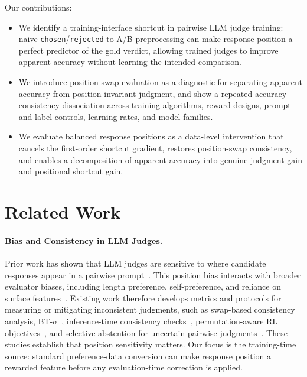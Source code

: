 \documentclass[letterpaper]{article}
\begin{document}
Our contributions:
\begin{itemize}
\item We identify a training-interface shortcut in pairwise LLM judge training: naive \texttt{chosen}/\texttt{rejected}-to-A/B preprocessing can make response position a perfect predictor of the gold verdict, allowing trained judges to improve apparent accuracy without learning the intended comparison.
\item We introduce position-swap evaluation as a diagnostic for separating apparent accuracy from position-invariant judgment, and show a repeated accuracy-consistency dissociation across training algorithms, reward designs, prompt and label controls, learning rates, and model families.
\item We evaluate balanced response positions as a data-level intervention that cancels the first-order shortcut gradient, restores position-swap consistency, and enables a decomposition of apparent accuracy into genuine judgment gain and positional shortcut gain.
\end{itemize}

\section{Related Work}

\paragraph{Bias and Consistency in LLM Judges.}
Prior work has shown that LLM judges are sensitive to where candidate responses appear in a pairwise prompt~\citep{zheng2023judging,wang2024largelanguagemodels,zhu2024judgebench}. This position bias interacts with broader evaluator biases, including length preference, self-preference, and reliance on surface features~\citep{wu2024style,koo2024benchmarking,li2024quantifying,park2024disentangling,singhal2024long}. Existing work therefore develops metrics and protocols for measuring or mitigating inconsistent judgments, such as swap-based consistency analysis, BT-$\sigma$~\citep{btsigma2026}, inference-time consistency checks~\citep{trustjudge2026}, permutation-aware RL objectives~\citep{eisgrpo2026,pagrpo2026}, and selective abstention for uncertain pairwise judgments~\citep{scope2026}. These studies establish that position sensitivity matters. Our focus is the training-time source: standard preference-data conversion can make response position a rewarded feature before any evaluation-time correction is applied.
\end{document}
